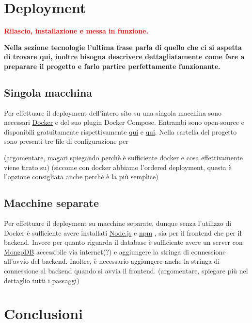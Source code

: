 \documentclass[a4paper,12pt]{report}
\newcommand{\node}{\href{https://nodejs.org/it/}{Node.js} }
\newcommand{\npm}{\href{https://www.npmjs.com/}{npm} }
\newcommand{\mongodb}{\href{https://www.mongodb.com/it-it}{MongoDB} }
\newcommand{\docker}{\href{https://www.docker.com/}{Docker} }
\begin{document}
\clearpage
\chapter{Deployment}\label{sec:deployment}
\textcolor{red}{\textbf{Rilascio, installazione e messa in funzione.}}

\textbf{Nella sezione tecnologie l'ultima frase parla di quello che ci si aspetta di trovare qui, inoltre bisogna descrivere dettagliatamente come fare a preparare il progetto e farlo partire perfettamente funzionante.}

\section{Singola macchina}
Per effettuare il deployment dell'intero sito su una singola macchina sono necessari \docker e del suo plugin Docker Compose. Entrambi sono open-source e disponibili gratuitamente rispettivamente \href{https://docs.docker.com/desktop/#download-and-install}{qui} e \href{https://docs.docker.com/compose/install/}{qui}. Nella cartella del progetto sono presenti tre file di configurazione per 

(argomentare, magari spiegando perchè è sufficiente docker e cosa effettivamente viene tirato su)
(siccome con docker abbiamo l'ordered deployment, questa è l'opzione consigliata anche perchè è la più semplice)

\section{Macchine separate}
Per effettuare il deployment su macchine separate, dunque senza l'utilizzo di Docker è sufficiente avere installati \node e \npm, sia per il frontend che per il backend. Invece per quanto riguarda il database è sufficiente avere un server con \mongodb accessibile via internet(?) e aggiungere la stringa di connessione all'avvio del backend. Inoltre, è necessario aggiungere anche la stringa di connessione al backend quando si avvia il frontend.
(argomentare, spiegare più nel dettaglio tutti i passaggi)

\clearpage
\chapter{Conclusioni}
\end{document}
